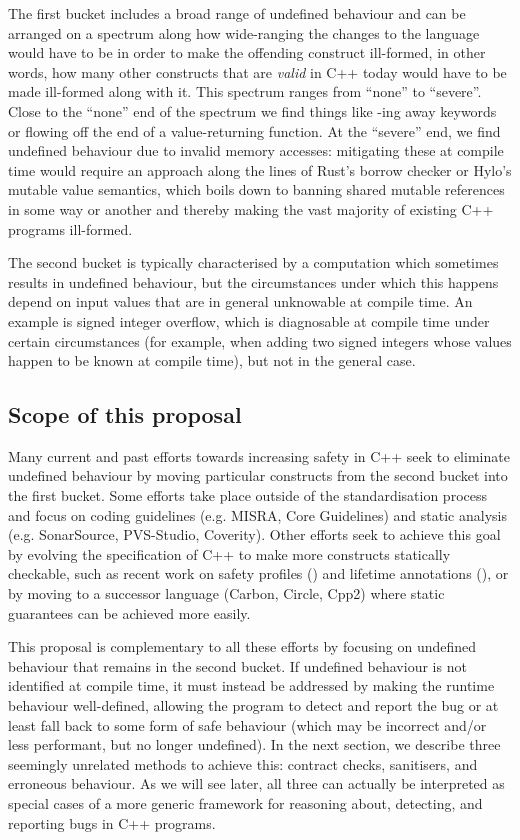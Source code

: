 The first bucket includes a broad range of undefined behaviour and can be arranged on a spectrum along how wide-ranging the changes to the language would have to be in order to make the offending construct ill-formed, in other words, how many other constructs that are \emph{valid} in C++ today would have to be made ill-formed along with it. This spectrum ranges from ``none'' to ``severe''. Close to the ``none'' end of the spectrum we find things like -ing away keywords or flowing off the end of a value-returning function. At the ``severe'' end, we find undefined behaviour due to invalid memory accesses: mitigating these at compile time would require an approach along the lines of Rust's borrow checker or Hylo's mutable value semantics, which boils down to banning shared mutable references in some way or another and thereby making the vast majority of existing C++ programs ill-formed.

The second bucket is typically characterised by a computation which sometimes results in undefined behaviour, but the circumstances under which this happens depend on input values that are in general unknowable at compile time. An example is signed integer overflow, which is diagnosable at compile time under certain circumstances (for example, when adding two signed integers whose values happen to be known at compile time), but not in the general case.

\subsection{Scope of this proposal}

Many current and past efforts towards increasing safety in C++ seek to eliminate undefined behaviour by moving particular constructs from the second bucket into the first bucket. Some efforts take place outside of the standardisation process and focus on coding guidelines (e.g. MISRA, Core Guidelines) and static analysis (e.g. SonarSource, PVS-Studio, Coverity). Other efforts seek to achieve this goal by evolving the specification of C++ to make more constructs statically checkable, such as recent work on safety profiles (\cite{P2687R0}) and lifetime annotations (\cite{P2771R1}), or by moving to a successor language (Carbon, Circle, Cpp2) where static guarantees can be achieved more easily.

This proposal is complementary to all these efforts by focusing on undefined behaviour that remains in the second bucket. If undefined behaviour is not identified at compile time, it must instead be addressed by making the runtime behaviour well-defined, allowing the program to detect and report the bug or at least fall back to some form of safe behaviour (which may be incorrect and/or less performant, but no longer undefined). In the next section, we describe three seemingly unrelated methods to achieve this: contract checks, sanitisers, and erroneous behaviour. As we will see later, all three can actually be interpreted as special cases of a more generic framework for reasoning about, detecting, and reporting bugs in C++ programs.

